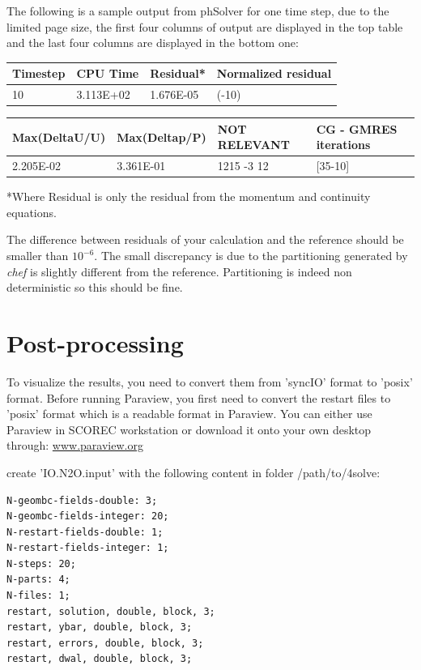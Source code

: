 \documentclass{article}
\begin{document}
The following is a sample output from phSolver for one time step, due to the limited page size, the first four columns of output are displayed in the top table and the last four columns are displayed in the bottom one:
\begin{center}
\begin{tabular}{| l | l | l | l |}
\hline
Timestep & CPU Time & Residual* & Normalized residual \\ \hline
10 & 3.113E+02 & 1.676E-05 & (-10) \\ 
\hline
\end{tabular}
\end{center}

\begin{center}
\begin{tabular}{| l | l | l | l |}
\hline
Max(DeltaU/U) & Max(Deltap/P) & NOT RELEVANT& CG - GMRES iterations\\ \hline
2.205E-02 & 3.361E-01 & 1215 -3 12 & [35-10] \\
\hline
\end{tabular}
\end{center}

*Where Residual is only the residual from the momentum and continuity equations.

The difference between residuals of your calculation and the reference should be smaller than $10^{-6}$. The small discrepancy is due to the partitioning generated by \textit{chef} is slightly different from the reference. Partitioning is indeed non deterministic so this should be fine.

\section{Post-processing}

To visualize the results, you need to convert them from 'syncIO' format to 'posix' format. Before running Paraview, you first need to convert the restart files to 'posix' format which is a readable format in Paraview. You can either use Paraview in SCOREC workstation or download it onto your own desktop through:
\url{www.paraview.org}

create 'IO.N2O.input' with the following content in folder /path/to/4solve:
\begin{lstlisting}
N-geombc-fields-double: 3;
N-geombc-fields-integer: 20;
N-restart-fields-double: 1;
N-restart-fields-integer: 1;
N-steps: 20;
N-parts: 4;
N-files: 1;
restart, solution, double, block, 3;
restart, ybar, double, block, 3;
restart, errors, double, block, 3;
restart, dwal, double, block, 3;
\end{lstlisting}
\end{document}
